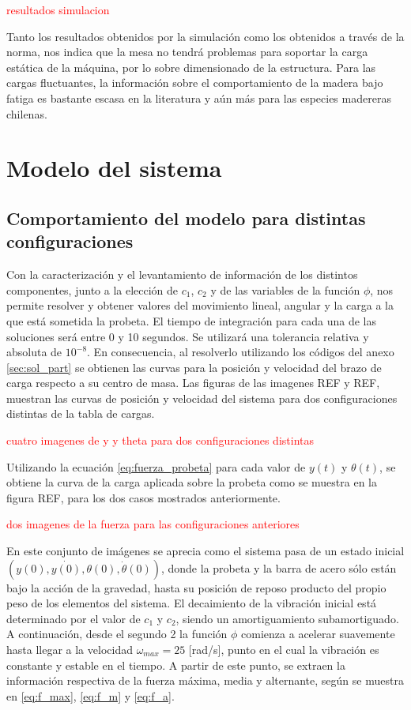 \textcolor{red}{resultados simulacion}

Tanto los resultados obtenidos por la simulación como los obtenidos a través de la norma, nos indica que la mesa no tendrá problemas para soportar la carga estática de la máquina, por lo sobre dimensionado de la estructura. Para las cargas fluctuantes, la información sobre el comportamiento de la madera bajo fatiga es bastante escasa en la literatura y aún más para las especies madereras chilenas. 

\section{Modelo del sistema}

\subsection{Comportamiento del modelo para distintas configuraciones}
Con la caracterización y el levantamiento de información de los distintos componentes, junto a la elección de $c_1$, $c_2$ y de las variables de la función $\phi$, nos permite resolver y obtener valores del movimiento lineal, angular y la carga a la que está sometida la probeta. El tiempo de integración para cada una de las soluciones será entre 0 y 10 segundos. Se utilizará una tolerancia relativa y absoluta de $10^{-8}$. En consecuencia, al resolverlo utilizando los códigos del anexo \ref{sec:sol_part} se obtienen las curvas para la posición y velocidad del brazo de carga respecto a su centro de masa. Las figuras de las imagenes REF y REF, muestran las curvas de posición y velocidad del sistema para dos configuraciones distintas de la tabla de cargas. 

\textcolor{red}{cuatro imagenes de y y theta para dos configuraciones distintas}

Utilizando la ecuación \ref{eq:fuerza_probeta} para cada valor de $y(t)$ y $\theta(t)$, se obtiene la curva de la carga aplicada sobre la probeta como se muestra en la figura REF, para los dos casos mostrados anteriormente.

\textcolor{red}{dos imagenes de la fuerza para las configuraciones anteriores}
 
En este conjunto de imágenes se aprecia como el sistema pasa de un estado inicial $(y(0), \dot{y(0)}, \theta(0), \dot{\theta}(0))$, donde la probeta y la barra de acero sólo están bajo la acción de la gravedad, hasta su posición de reposo producto del propio peso de los elementos del sistema. El decaimiento de la vibración inicial está determinado por el valor de $c_1$ y $c_2$, siendo un amortiguamiento subamortiguado. A continuación, desde el segundo 2 la función $\phi$ comienza a acelerar suavemente hasta llegar a la velocidad $\omega_{max} = 25$ [rad/s], punto en el cual la vibración es constante y estable en el tiempo. A partir de este punto, se extraen la información respectiva de la fuerza máxima, media y alternante, según se muestra en \ref{eq:f_max}, \ref{eq:f_m} y \ref{eq:f_a}. 

